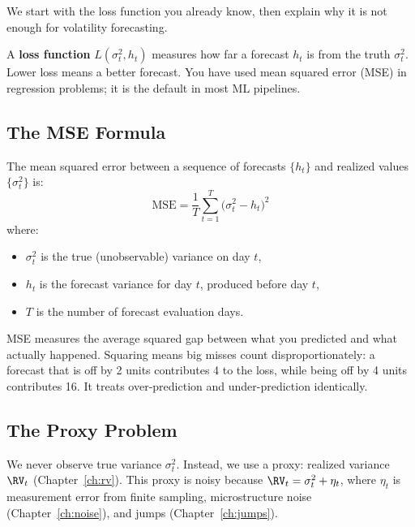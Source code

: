 We start with the loss function you already know, then explain why it is not enough for volatility forecasting.

\begin{prereq}
A \textbf{loss function} $L(\sigma^2_t, h_t)$ measures how far a forecast $h_t$ is from the truth $\sigma^2_t$.
Lower loss means a better forecast.
You have used mean squared error (MSE) in regression problems; it is the default in most ML pipelines.
\end{prereq}

\subsection{The MSE Formula}

The mean squared error between a sequence of forecasts $\{h_t\}$ and realized values $\{\sigma^2_t\}$ is:
\begin{equation}
\label{eq:mse}
\text{MSE} = \frac{1}{T}\sum_{t=1}^{T} \bigl(\sigma^2_t - h_t\bigr)^2
\end{equation}
where:
\begin{itemize}[nosep]
  \item $\sigma^2_t$ is the true (unobservable) variance on day $t$,
  \item $h_t$ is the forecast variance for day $t$, produced before day $t$,
  \item $T$ is the number of forecast evaluation days.
\end{itemize}

\begin{intuition}
MSE measures the average squared gap between what you predicted and what actually happened.
Squaring means big misses count disproportionately: a forecast that is off by 2 units contributes 4 to the loss, while being off by 4 units contributes 16.
It treats over-prediction and under-prediction identically.
\end{intuition}

\subsection{The Proxy Problem}

We never observe true variance $\sigma^2_t$.
Instead, we use a proxy: realized variance $\RV_t$ (Chapter~\ref{ch:rv}).
This proxy is noisy because $\RV_t = \sigma^2_t + \eta_t$, where $\eta_t$ is measurement error from finite sampling, microstructure noise (Chapter~\ref{ch:noise}), and jumps (Chapter~\ref{ch:jumps}).

